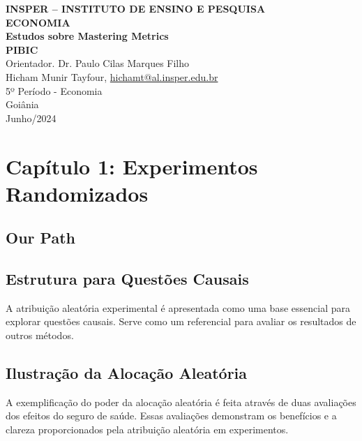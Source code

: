\documentclass[a4paper,12pt]{article}[abntex2]
\begin{document}
\begin{titlepage}
    \centering
    \vspace*{1cm}
    \Large\textbf{INSPER – INSTITUTO DE ENSINO E PESQUISA}\\
    \Large \textbf{ECONOMIA}\\
    \vspace{1.5cm}
    \Large\textbf{Estudos sobre Mastering Metrics}\\
    \textbf{PIBIC}\\
    \vspace{1.5cm}
    Orientador. Dr. Paulo Cilas Marques Filho\\
    \vfill
    \normalsize
    Hicham Munir Tayfour, \href{mailto:hichamt@al.insper.edu.br}{hichamt@al.insper.edu.br}\\
    5º Período - Economia\\
    \vfill
    Goiânia\\
    Junho/2024
\end{titlepage}

\newpage
\tableofcontents
\thispagestyle{empty} %
\newpage
\setcounter{page}{1} %
\justify
\onehalfspacing

\pagestyle{fancy}
\fancyhf{}
\rhead{\thepage}

\section{Capítulo 1: Experimentos Randomizados}

\subsection*{Our Path}

\subsection*{Estrutura para Questões Causais}
A atribuição aleatória experimental é apresentada como uma base essencial para explorar questões causais. Serve como um referencial para avaliar os resultados de outros métodos.

\subsection*{Ilustração da Alocação Aleatória}
A exemplificação do poder da alocação aleatória é feita através de duas avaliações dos efeitos do seguro de saúde. Essas avaliações demonstram os benefícios e a clareza proporcionados pela atribuição aleatória em experimentos.
\end{document}
